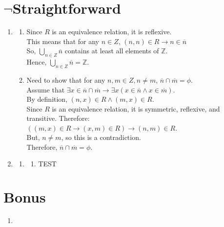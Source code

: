 \documentclass[a4paper]{article}
\begin{document}
\section{$\neg$Straightforward}
    \begin{enumerate}
        \item \begin{enumerate}
            \item Since $R$ is an equivalence relation, it is reflexive.\\ 
            This means that for any $n \in Z$, $(n, n) \in R \rightarrow n \in \overline{n}$\\
            So, $\bigcup_{n \in Z}{\overline{n}}$ contains at least all elements of $\mathbb{Z}$.\\

            Hence, $\bigcup_{n \in Z}{\overline{n}} = \mathbb{Z}$.\\

            \item Need to show that for any $n, m \in Z, n \neq m$, $\overline{n} \cap \overline{m} = \phi$.\\
            Assume that $\exists x \in \overline{n} \cap \overline{m} \rightarrow \exists x (x \in \overline{n} \land x \in \overline{m})$.\\
            By definition, $(n, x) \in R \land (m, x) \in R$.\\

            Since $R$ is an equivalence relation, it is symmetric, reflexive, and transitive. Therefore:\\
            $((m, x) \in R \rightarrow (x, m) \in R) \rightarrow (n, m) \in R$.\\

            But, $n \neq m$, so this is a contradiction.\\

            Therefore, $\overline{n} \cap \overline{m} = \phi$.\\
        \end{enumerate}


        \item \begin{enumerate}[label=(\roman*)]
            \item \begin{enumerate}[label=(\alph*)]
                \item TEST
            \end{enumerate}
        \end{enumerate}
    \end{enumerate}

\newpage
\section{Bonus}
    \begin{enumerate}
        \item 
    \end{enumerate}
\end{document}
